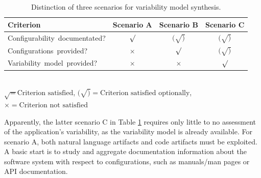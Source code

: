\begin{table} 
	\centering
	\begin{tabular}{lccc}%
	\toprule
	\textbf{Criterion} & \textbf{Scenario A} & \textbf{Scenario B} &
	\textbf{Scenario C}
	\\
	\midrule
	\mbox{Configurability documentated?} & $\surd$ & $(\surd)$ & $(\surd)$ \\
	\mbox{Configurations provided?} & $\times$ & $\surd$ & $(\surd)$ \\
	\mbox{Variability model provided?} & $\times$ & $\times$ & $\surd$ \\
	\bottomrule
	\end{tabular}\\
	\vspace{1mm}
	{\footnotesize $\surd = \text{Criterion satisfied}$, $(\surd) =
	\text{Criterion satisfied optionally}$, $\times = \text{Criterion not
	satisfied}$}
	\caption{Distinction of three scenarios for variability model synthesis. }
	\label{tab:synthesis}
\end{table}

Apparently, the latter scenario C in Table \ref{tab:synthesis} requires only
little to no assessment of the application's variability, as the variability
model is already available.
For scenario A, both natural language artifacts and code artifacts must be
exploited. A basic start is to study and aggregate documentation information
about the software system with respect to configurations, such as manuals/man
pages or API documentation. 

